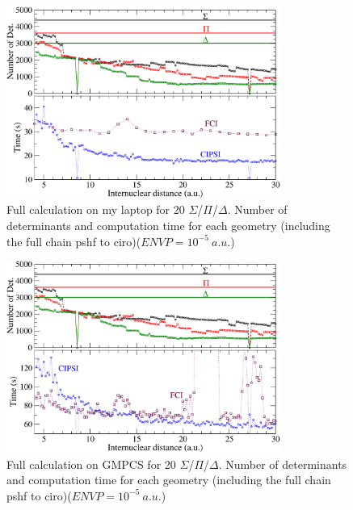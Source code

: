 \documentclass[a4paper,10pt]{article}
\begin{document}
 \begin{figure}[ht!]
  \begin{center}
        \includegraphics[width=0.8\textwidth]{fig/time_laptop.pdf}
    \caption{\label{time_p} \small Full calculation on my laptop for 20 $\Sigma$/$\Pi$/$\Delta$. Number of determinants and computation time for each geometry (including the full chain pshf to ciro)($ENVP=10^{-5}~a.u.$)}
  \end{center}
\end{figure}

 \begin{figure}[hb!]
  \begin{center}
        \includegraphics[width=0.8\textwidth]{fig/time_GMPCS.pdf}
    \caption{\label{time_l} \small Full calculation on GMPCS for 20 $\Sigma$/$\Pi$/$\Delta$. Number of determinants and computation time for each geometry (including the full chain pshf to ciro)($ENVP=10^{-5}~a.u.$)}
  \end{center}
\end{figure}

\pagebreak
\end{document}
